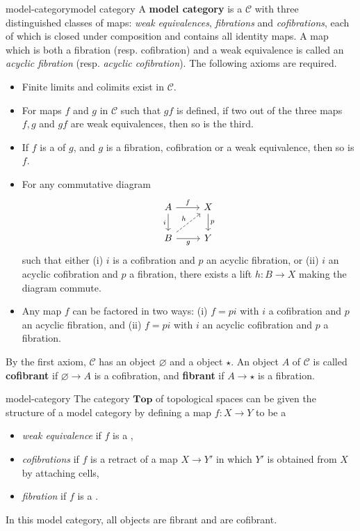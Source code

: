 \begin{topic}{model-category}{model category}
    A \textbf{model category} is a  $\mathcal{C}$ with three distinguished classes of maps: \textit{weak equivalences}, \textit{fibrations} and \textit{cofibrations}, each of which is closed under composition and contains all identity maps. A map which is both a fibration (resp. cofibration) and a weak equivalence is called an \textit{acyclic fibration} (resp. \textit{acyclic cofibration}). The following axioms are required.
    \begin{itemize}
        \item Finite limits and colimits exist in $\mathcal{C}$.
        \item For maps $f$ and $g$ in $\mathcal{C}$ such that $gf$ is defined, if two out of the three maps $f, g$ and $gf$ are weak equivalences, then so is the third.
        \item If $f$ is a  of $g$, and $g$ is a fibration, cofibration or a weak equivalence, then so is $f$.
        \item For any commutative diagram
        \[ \svg \begin{tikzcd} A \arrow[swap]{d}{i} \arrow{r}{f} & X \arrow{d}{p} \\ B \arrow[swap]{r}{g} \arrow[dashed]{ur}{h} & Y \end{tikzcd} \]
        such that either (i) $i$ is a cofibration and $p$ an acyclic fibration, or (ii) $i$ an acyclic cofibration and $p$ a fibration, there exists a lift $h \colon B \to X$ making the diagram commute.
        \item Any map $f$ can be factored in two ways: (i) $f = pi$ with $i$ a cofibration and $p$ an acyclic fibration, and (ii) $f = pi$ with $i$ an acyclic cofibration and $p$ a fibration.
    \end{itemize}
    By the first axiom, $\mathcal{C}$ has an  object $\varnothing$ and a  object $\star$. An object $A$ of $\mathcal{C}$ is called \textbf{cofibrant} if $\varnothing \to A$ is a cofibration, and \textbf{fibrant} if $A \to \star$ is a fibration.
\end{topic}

\begin{example}{model-category}
    The category $\textbf{Top}$ of topological spaces can be given the structure of a model category by defining a map $f \colon X \to Y$ to be a
    \begin{itemize}
        \item \textit{weak equivalence} if $f$ is a ,
        \item \textit{cofibrations} if $f$ is a retract of a map $X \to Y'$ in which $Y'$ is obtained from $X$ by attaching cells,
        \item \textit{fibration} if $f$ is a .
    \end{itemize}
    In this model category, all objects are fibrant and  are cofibrant.
\end{example}

